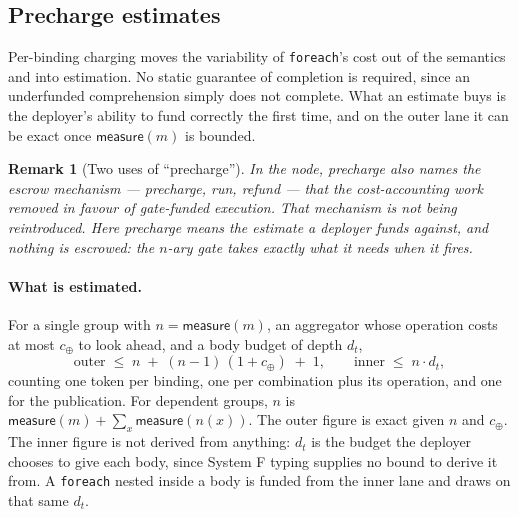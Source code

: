 \documentclass[11pt]{article}
\theoremstyle{branddef}
\theoremstyle{brandplain}
\theoremstyle{brandrem}
\newtheorem{remark}[definition]{Remark}
\newcommand{\meas}{\mathsf{measure}}
\newcommand{\fe}{\texttt{foreach}}
\begin{document}
\subsection{Precharge estimates}
\label{sec:precharge}

Per-binding charging moves the variability of \fe{}'s cost out of the semantics
and into estimation. No static guarantee of completion is required, since an
underfunded comprehension simply does not complete. What an estimate buys is
the deployer's ability to fund correctly the first time, and on the outer lane
it can be exact once \(\meas(m)\) is bounded.

\begin{remark}[Two uses of ``precharge'']
In the node, \emph{precharge} also names the escrow mechanism --- precharge,
run, refund --- that the cost-accounting work removed in favour of
gate-funded execution. That mechanism is not being reintroduced. Here
\emph{precharge} means the estimate a deployer funds against, and nothing is
escrowed: the \(n\)-ary gate takes exactly what it needs when it
fires.
\end{remark}

\paragraph{What is estimated.} For a single group with \(n = \meas(m)\), an
aggregator whose operation costs at most \(c_\oplus\) to look ahead, and a body
budget of depth \(d_t\),
\[
\text{outer} \;\le\; n \;+\; (n-1)\,(1 + c_\oplus) \;+\; 1,
\qquad
\text{inner} \;\le\; n \cdot d_t ,
\]
counting one token per binding, one per combination plus its operation, and
one for the publication. For dependent groups, \(n\) is
\(\meas(m) + \sum_x \meas(n(x))\). The outer figure is exact given \(n\) and
\(c_\oplus\). The inner figure is not derived from anything: \(d_t\) is the
budget the deployer chooses to give each body, since System F typing supplies
no bound to derive it from. A \fe{} nested inside a body is funded from the
inner lane and draws on that same \(d_t\).
\end{document}
